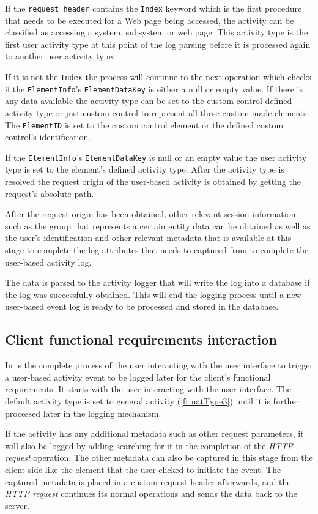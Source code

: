 If the \texttt{request header} contains the \texttt{Index} keyword which is the first procedure that needs to be executed for a Web page being accessed, the activity can be classified as accessing a system, subsystem or web page. This activity type is the first user activity type at this point of the log parsing before it is processed again to another user activity type. \par If it is not the \texttt{Index} the process will continue to the next operation which checks if the \texttt{ElementInfo}'s \texttt{ElementDataKey} is either a null or empty value. If there is any data available the activity type can be set to the custom control defined activity type or just custom control to represent all these custom-made elements. The \texttt{ElementID} is set to the custom control element or the defined custom control's identification. \par If the \texttt{ElementInfo}'s \texttt{ElementDataKey} is null or an empty value the user activity type is set to the element's defined activity type. After the activity type is resolved the request origin of the user-based activity is obtained by getting the request's absolute path.\par After the request origin has been obtained, other relevant session information such as the group that represents a certain entity data can be obtained as well as the user's identification and other relevant metadata that is available at this stage to complete the log attributes that needs to captured from  to complete the user-based activity log.\par The data is parsed to the activity logger that will write the log into a database if the log was successfully obtained. This will end the logging process until a new user-based event log is ready to be processed and stored in the database.

\subsection{Client functional requirements interaction}
\par In  is the complete process of the user interacting with the user interface to trigger a user-based activity event to be logged later for the client's functional requirements. It starts with the user interacting with the user interface. The default activity type is set to general activity (\ref{fr:uatType3}) until it is further processed later in the logging mechanism.\par If the activity has any additional metadata such as other request parameters, it will also be logged by adding searching for it in the completion of the \textit{HTTP request} operation. The other metadata can also be captured in this stage from the client side like the element that the user clicked to initiate the event. The captured metadata is placed in a custom request header afterwards, and the \textit{HTTP request} continues its normal operations and sends the data back to the server.

